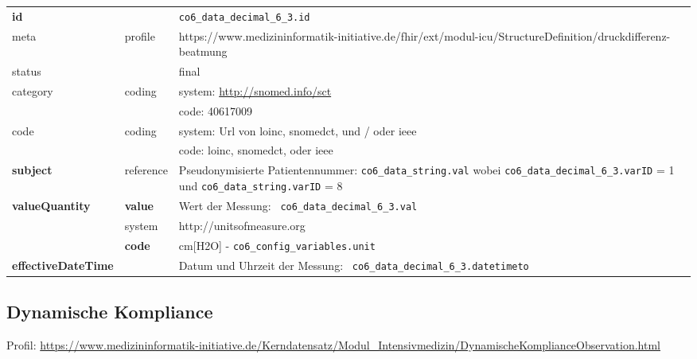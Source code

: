 \begin{longtable}{|l|l|p{7.5cm}|}
        \hline
        \rowcolor{lightgray} \multicolumn{3}{|l|}{Data Mapping (inhaltlich)} \\ \hline
        \textbf{id} &  & \texttt{co6\_data\_decimal\_6\_3.id} \\ \hline
	meta & profile & https://www.medizininformatik-initiative.de/fhir/ext/modul-icu/StructureDefinition/druckdifferenz-beatmung \\ \hline 
	status &  & final   \\ \hline 
	category & coding & system: \url{http://snomed.info/sct} \\
\cline{3-3}
	& & code: 40617009 \\ \hline
	code & coding & system: Url von \ac{loinc}, \ac{snomedct}, und / oder \ac{ieee} \\ 
	\cline{3-3} 
	 &  & code: \ac{loinc}, \ac{snomedct}, oder \ac{ieee} \\ \hline
	 \textbf{subject} & reference & Pseudonymisierte Patientennummer: \texttt{co6\_data\_string.val} wobei \texttt{co6\_data\_decimal\_6\_3.varID} = 1 und \texttt{co6\_data\_string.varID} = 8 \\ \hline
	 \textbf{valueQuantity}  & \textbf{value} & Wert der Messung: \texttt{
co6\_data\_decimal\_6\_3.val} \\
        \cline{2-3}
         & system & http://unitsofmeasure.org \\
         \cline{2-3}
         & \textbf{code} &
cm[H2O] - \texttt{co6\_config\_variables.unit}
\\ \hline
     \textbf{effectiveDateTime}  & & Datum und Uhrzeit der Messung: \texttt{
co6\_data\_decimal\_6\_3.datetimeto} \\ \hline
\end{longtable}

\subsection{Dynamische Kompliance} 

Profil: \url{https://www.medizininformatik-initiative.de/Kerndatensatz/Modul_Intensivmedizin/DynamischeKomplianceObservation.html}

